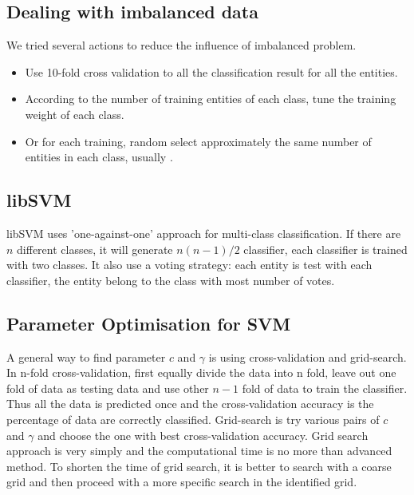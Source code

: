 \subsection{Dealing with imbalanced data}
We tried several actions to reduce the influence of imbalanced problem.
\begin{itemize}
\item Use 10-fold cross validation to all the classification result for all the entities. 
\item According to the number of training entities of each class, tune the training weight of each class.
\item Or for each training, random select approximately the same number of entities in each class, usually .
\end{itemize}
\subsection{libSVM}
libSVM uses 'one-against-one' approach for multi-class classification\cite{CC01a}. If there are $n$ different classes, it will generate $n(n-1)/2$ classifier, each classifier is trained with two classes. It also use a voting strategy: each entity is test with each classifier, the entity belong to the class with most number of votes.
\subsection{Parameter Optimisation for SVM}
A general way to find parameter $c$ and $\gamma$ is using cross-validation and grid-search. In n-fold cross-validation, first equally divide the data into n fold, leave out one fold of data as testing data and use other $n-1$ fold of data to train the classifier. Thus all the data is predicted once and the cross-validation accuracy is the percentage of data are correctly classified. 
Grid-search is try various pairs of $c$ and $\gamma$ and choose the one with best cross-validation accuracy. Grid search approach is very simply and the computational time is no more than advanced method. To shorten the time of grid search, it is better to search with a coarse grid and then proceed with a more specific search in the identified grid.
